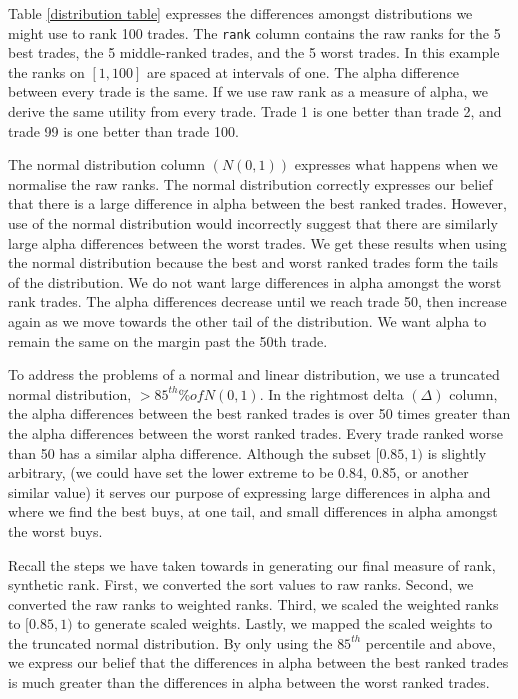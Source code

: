 \documentclass{article}
\begin{document}
Table \ref{distribution table} expresses the differences amongst
distributions we might use to rank 100 trades.  The \texttt{rank}
column contains the raw ranks for the 5 best trades, the 5
middle-ranked trades, and the 5 worst trades.  In this example the
ranks on $[1,100]$ are spaced at intervals of one.  The alpha
difference between every trade is the same.  If we use raw rank as a
measure of alpha, we derive the same utility from every trade.  Trade
1 is one better than trade 2, and trade 99 is one better than trade
100.

The normal distribution column $(N(0,1))$ expresses what happens when
we normalise the raw ranks.  The normal distribution correctly
expresses our belief that there is a large  difference in
alpha between the best ranked trades.  However, use of the normal
distribution would incorrectly suggest that there are similarly large
alpha differences between the worst trades.  We get these results when
using the normal distribution because the best and worst ranked trades
form the tails of the distribution.  We do not want large 
differences in alpha amongst the worst rank trades.  The 
alpha differences decrease until we reach trade 50, then increase
again as we move towards the other tail of the distribution.  We want
alpha to remain the same on the margin past the 50th trade.

To address the problems of a normal and linear distribution, we use a
truncated normal distribution, $> 85^{th} \% of N(0,1)$.  In the
right\-most delta $(\Delta)$ column, the  alpha differences
between the best ranked trades is over 50 times greater than the
 alpha differences between the worst ranked trades.  Every
trade ranked worse than 50 has a similar  alpha difference.
Although the subset $[0.85,1)$ is slightly arbitrary, (we could have
set the lower extreme to be 0.84, 0.85, or another similar value) it
serves our purpose of expressing large differences in  alpha
and where we find the best buys, at one tail, and small differences in
 alpha amongst the worst buys.

Recall the steps we have taken towards in generating our final measure
of rank, synthetic rank.  First, we converted the sort values to raw
ranks.  Second, we converted the raw ranks to weighted ranks.  Third,
we scaled the weighted ranks to $[0.85,1)$ to generate scaled weights.
Lastly, we mapped the scaled weights to the truncated normal
distribution.  By only using the $85^{th}$ percentile and above, we
express our belief that the differences in alpha between the best
ranked trades is much greater than the differences in alpha between
the worst ranked trades.
\end{document}
